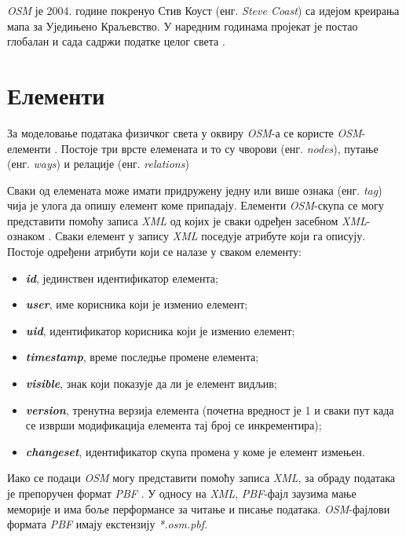 \documentclass[12pt,oneside]{memoir}
\begin{document}
\textit{OSM} је 2004. године покренуо Стив Коуст (енг. \textit{Steve Coast}) са идејом креирања мапа за Уједињено Краљевство. У наредним годинама пројекат је постао глобалан и сада садржи податке целог света \cite{osm_wiki}.

\section{Елементи}
\label{sec:osm_elementi}

За моделовање података физичког света у оквиру \textit{OSM}-а се користе \textit{OSM}-елементи \cite{osm_wiki}. Постоје три врсте елемената и то су чворови (енг. \textit{nodes}), путање (енг. \textit{ways}) и релације (енг. \textit{relations})

Сваки од елемената може имати придружену једну или више ознака (енг. \textit{tag}) чија је улога да опишу елемент коме припадају. Елементи \textit{OSM}-скупа се могу представити помоћу записа \textit{XML}  од којих је сваки одређен засебном \textit{XML}-ознаком \cite{osm_xml}. Сваки елемент у запису \textit{XML} поседује атрибуте који га описују. Постоје одређени атрибути који се налазе у сваком елементу:

\begin{itemize}
	\item \textbf{\textit{id}}, јединствен идентификатор елемента;
	\item \textbf{\textit{user}}, име корисника који је изменио елемент;
	\item \textbf{\textit{uid}}, идентификатор корисника који је изменио елемент;
	\item \textbf{\textit{timestamp}}, време последње промене елемента;
	\item \textbf{\textit{visible}}, знак који показује да ли је елемент видљив;
	\item \textbf{\textit{version}}, тренутна верзија елемента (почетна вредност је 1 и сваки пут када се изврши модификација елемента тај број се инкрементира);
	\item \textbf{\textit{changeset}}, идентификатор скупа промена у коме је елемент измењен.
\end{itemize}

Иако се подаци \textit{OSM} могу представити помоћу записа \textit{XML}, за обраду података је препоручен формат \textit{PBF} \cite{osm_pbf_format}. У односу на \textit{XML}, \textit{PBF}-фајл заузима мање меморије и има боље перформансе за читање и писање података. \textit{OSM}-фајлови формата \textit{PBF} имају екстензију \textit{*.osm.pbf}. 
\end{document}
